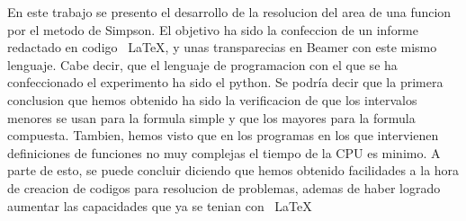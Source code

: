 En este trabajo se presento el desarrollo de la resolucion del area de una funcion por el metodo de Simpson.
El objetivo ha sido la confeccion de un informe redactado en codigo ~\LaTeX, y unas transparecias en Beamer con este mismo lenguaje. 
Cabe decir, que el lenguaje de programacion con el que se ha confeccionado el experimento ha sido el python.
Se podría decir que la primera conclusion que hemos obtenido ha sido la verificacion de que los intervalos menores se usan para la formula simple y 
que los mayores para la formula compuesta.
Tambien, hemos visto que en los programas en los que intervienen definiciones de funciones no muy complejas el tiempo de la CPU es minimo.
A parte de esto, se puede concluir diciendo que hemos obtenido facilidades a la hora de creacion de codigos para resolucion de problemas, ademas de haber 
logrado aumentar las capacidades que ya se tenian con ~\LaTeX